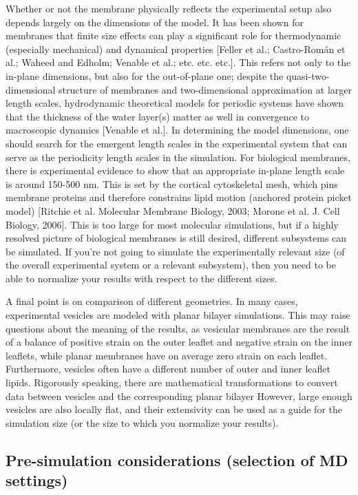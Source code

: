 \documentclass[9pt,bestpractices]{livecoms}
\begin{document}
Whether or not the membrane physically reflects the experimental setup also depends largely on the dimensions of the model.
It has been shown for membranes that finite size effects can play a significant role for thermodynamic (especially mechanical) and dynamical properties [Feller et al.; Castro-Rom\'an et al.; Waheed and Edholm; Venable et al.; etc. etc. etc.].
This refers not only to the in-plane dimensions, but also for the out-of-plane one; despite the quasi-two-dimensional structure of membranes and two-dimensional approximation at larger length scales, hydrodynamic theoretical models for periodic systems have shown that the thickness of the water layer(s) matter as well in convergence to macroscopic dynamics [Venable et al.].
In determining the model dimensions, one should search for the emergent length scales in the experimental system that can serve as the periodicity length scales in the simulation.
For biological membranes, there is experimental evidence to show that an appropriate in-plane length scale is around 150-500 nm.
This is set by the cortical cytoskeletal mesh, which pins membrane proteins and therefore constrains lipid motion (anchored protein picket model) [Ritchie et al. Molecular Membrane Biology, 2003; Morone et al. J. Cell Biology, 2006].
This is too large for most molecular simulations, but if a highly resolved picture of biological membranes is still desired, different subsystems can be simulated.
If you're not going to simulate the experimentally relevant size (of the overall experimental system or a relevant subsystem), then you need to be able to normalize your results with respect to the different sizes.

A final point is on comparison of different geometries.
In many cases, experimental vesicles are modeled with planar bilayer simulations.
This may raise questions about the meaning of the results, as vesicular membranes are the result of a balance of positive strain on the outer leaflet and negative strain on the inner leaflets, while planar membranes have on average zero strain on each leaflet.
Furthermore, vesicles often have a different number of outer and inner leaflet lipids.
Rigorously speaking, there are mathematical transformations to convert data between vesicles and the corresponding planar bilayer
However, large enough vesicles are also locally flat, and their extensivity can be used as a guide for the simulation size (or the size to which you normalize your results).

\subsection{Pre-simulation considerations (selection of MD settings)}
\end{document}
